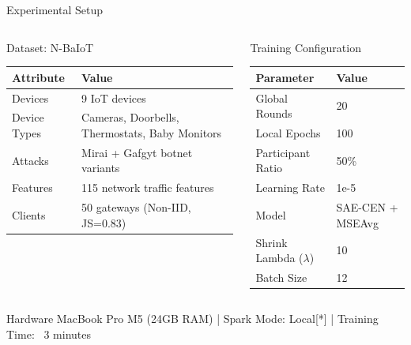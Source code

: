 \documentclass[10pt, aspectratio=169]{beamer}
\begin{document}
\begin{frame}{Experimental Setup}
    \begin{columns}
        \begin{block}{Dataset: N-BaIoT}
            \begin{table}
                \centering
                \footnotesize
                \begin{tabular}{@{}ll@{}}
                    \toprule
                    \textbf{Attribute} & \textbf{Value} \\
                    \midrule
                    Devices & 9 IoT devices \\
                    Device Types & Cameras, Doorbells, Thermostats, Baby Monitors \\
                    Attacks & Mirai + Gafgyt botnet variants \\
                    Features & 115 network traffic features \\
                    Clients & 50 gateways (Non-IID, JS=0.83) \\
                    \bottomrule
                \end{tabular}
            \end{table}
        \end{block}
        
        \begin{block}{Training Configuration}
            \begin{table}
                \centering
                \footnotesize
                \begin{tabular}{@{}ll@{}}
                    \toprule
                    \textbf{Parameter} & \textbf{Value} \\
                    \midrule
                    Global Rounds & 20 \\
                    Local Epochs & 100 \\
                    Participant Ratio & 50\% \\
                    Learning Rate & 1e-5 \\
                    Model & SAE-CEN + MSEAvg \\
                    Shrink Lambda ($\lambda$) & 10 \\
                    Batch Size & 12 \\
                    \bottomrule
                \end{tabular}
            \end{table}
        \end{block}
    \end{columns}
    
    \vspace{0.5cm}
    
    \begin{alertblock}{Hardware}
        MacBook Pro M5 (24GB RAM) | Spark Mode: Local[*] | Training Time: ~3 minutes
    \end{alertblock}
\end{frame}
\end{document}
